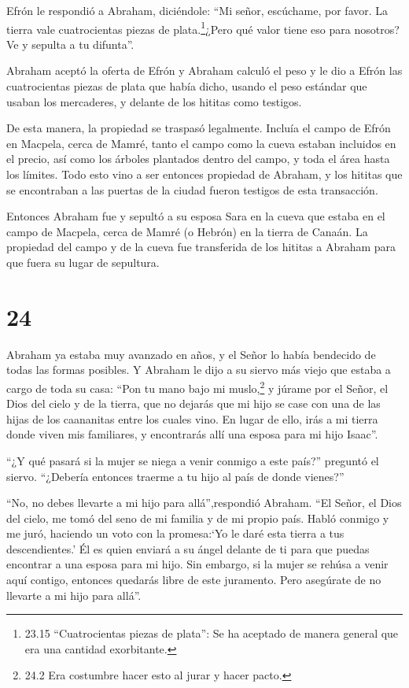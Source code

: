  Efrón le respondió a Abraham, diciéndole: 
``Mi señor, escúchame, por favor. La tierra vale cuatrocientas piezas de
plata.\footnote{23.15 ``Cuatrocientas piezas de plata'': Se ha aceptado
  de manera general que era una cantidad exorbitante.}¿Pero qué valor
tiene eso para nosotros? Ve y sepulta a tu difunta''.

 Abraham aceptó la oferta de Efrón y Abraham calculó el
peso y le dio a Efrón las cuatrocientas piezas de plata que había dicho,
usando el peso estándar que usaban los mercaderes, y delante de los
hititas como testigos.

 De esta manera, la propiedad se traspasó legalmente.
Incluía el campo de Efrón en Macpela, cerca de Mamré, tanto el campo
como la cueva estaban incluidos en el precio, así como los árboles
plantados dentro del campo, y toda el área hasta los límites.
 Todo esto vino a ser entonces propiedad de Abraham, y los
hititas que se encontraban a las puertas de la ciudad fueron testigos de
esta transacción.

 Entonces Abraham fue y sepultó a su esposa Sara en la
cueva que estaba en el campo de Macpela, cerca de Mamré (o Hebrón) en la
tierra de Canaán.  La propiedad del campo y de la cueva fue
transferida de los hititas a Abraham para que fuera su lugar de
sepultura.

\hypertarget{section-23}{%
\section{24}\label{section-23}}

 Abraham ya estaba muy avanzado en años, y el Señor lo había
bendecido de todas las formas posibles.  Y Abraham le dijo a
su siervo más viejo que estaba a cargo de toda su casa: ``Pon tu mano
bajo mi muslo,\footnote{24.2 Era costumbre hacer esto al jurar y hacer
  pacto.}  y júrame por el Señor, el Dios del cielo y de la
tierra, que no dejarás que mi hijo se case con una de las hijas de los
caananitas entre los cuales vino.  En lugar de ello, irás a
mi tierra donde viven mis familiares, y encontrarás allí una esposa para
mi hijo Isaac''.

 ``¿Y qué pasará si la mujer se niega a venir conmigo a este
país?'' preguntó el siervo. ``¿Debería entonces traerme a tu hijo al
país de donde vienes?''

 ``No, no debes llevarte a mi hijo para allá'',respondió
Abraham.  ``El Señor, el Dios del cielo, me tomó del seno de
mi familia y de mi propio país. Habló conmigo y me juró, haciendo un
voto con la promesa:`Yo le daré esta tierra a tus descendientes.' Él es
quien enviará a su ángel delante de ti para que puedas encontrar a una
esposa para mi hijo.  Sin embargo, si la mujer se rehúsa a
venir aquí contigo, entonces quedarás libre de este juramento. Pero
asegúrate de no llevarte a mi hijo para allá''.

